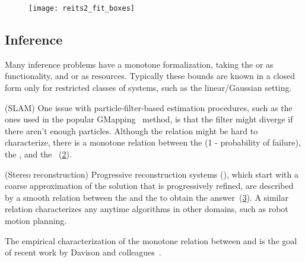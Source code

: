 \begin{figure}[h]
  \centering
  \texttt{[image: reits2\_fit\_boxes]}
  \caption{\label{fig:packing}}
\end{figure}

\subsection{Inference}

Many inference problems have a monotone formalization, taking the
 or  as functionality, and 
or  as resources. Typically these bounds are known in
a closed form only for restricted classes of systems, such as the
linear/Gaussian setting.

\begin{example}
(SLAM)
  One issue with particle-filter-based estimation procedures,
  such as the ones used in the popular GMapping~\cite{grisetti07improved}
  method, is that the filter might diverge if there aren't enough particles.
  Although the relation might be hard to characterize, there is a monotone
  relation between the  (1 - probability of failure),
  the , and the ~(\cref{fig:gmapping}).
\end{example}

\begin{figure}[h]
  \centering
  \caption{\label{fig:gmapping} }
\end{figure}



\begin{example}
(Stereo reconstruction)
  Progressive reconstruction systems (\cite{locher16progressive}),
  which start with a coarse approximation of the solution that is progressively
  refined, are described by a smooth relation between the 
  and the  to obtain the answer~(\cref{fig:progressive}).
  A similar relation characterizes any anytime algorithms in other domains,
  such as robot motion planning.
\end{example}


\begin{figure}[h]
  \centering
  \caption{\label{fig:progressive}}
\end{figure}


\begin{example}
  The empirical characterization of the monotone relation between  and 
  is the goal of recent work by Davison and colleagues~\cite{nardi15introducing,zia16comparative}.
\end{example}

